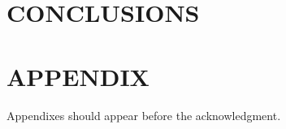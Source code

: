 \documentclass[letterpaper, 10 pt, conference]{ieeeconf}  %
\begin{document}
%
%
%
%   
\section{CONCLUSIONS}
\addtolength{\textheight}{-12cm}   %
\section*{APPENDIX}
Appendixes should appear before the acknowledgment.
\end{document}
